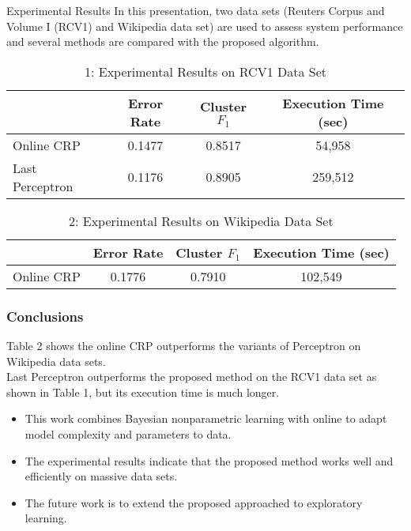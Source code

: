 \documentclass[11pt]{beamer}
\begin{document}
\begin{frame}{Experimental Results}
In this presentation, two data sets (Reuters Corpus and Volume I (RCV1) and Wikipedia data set) are used to assess system performance and several methods are compared with the proposed
	algorithm.
	
	

\begin{table}[h]
	\centering
	\caption{1: Experimental Results on RCV1 Data Set}
	\begin{tabular}{lccc}
		\toprule
		& Error Rate & Cluster $F_1$ & Execution Time (sec) \\
		\midrule
		Online CRP & 0.1477 & 0.8517 & 54,958 \\
		Last Perceptron & 0.1176 & 0.8905 & 259,512 \\
		\bottomrule
	\end{tabular}
\end{table}

\begin{table}[h]
	\centering
	\caption{2: Experimental Results on Wikipedia Data Set}
	\begin{tabular}{lccc}
		\toprule
		& Error Rate & Cluster $F_1$ & Execution Time (sec) \\
		\midrule
		Online CRP & 0.1776 & 0.7910 & 102,549 \\
		\bottomrule
	\end{tabular}

\end{table}

\end{frame}

	\begin{frame}
		\frametitle{Conclusions}
	Table 2 shows the
		online CRP outperforms the variants of Perceptron on Wikipedia data sets.\\
		Last Perceptron outperforms the proposed method on the
		RCV1 data set as shown in Table 1, but its execution time
		is much longer.
		\begin{itemize}
			\item This work combines Bayesian nonparametric learning with online to adapt model complexity and parameters to data.
			\item The experimental results indicate that the proposed method works well and efficiently on massive data sets.
			\item The future work is to extend the proposed approached to exploratory learning.
		\end{itemize}
	\end{frame}
	
\end{document}
